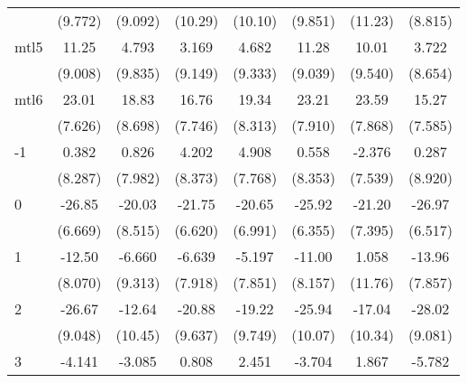 \documentclass{article}
\begin{document}
{\begin{longtable}{l*{7}{c}}
                &  (9.772)         &  (9.092)         &  (10.29)         &  (10.10)         &  (9.851)         &  (11.23)         &  (8.815)         \\
mtl5            &    11.25         &    4.793         &    3.169         &    4.682         &    11.28         &    10.01         &    3.722         \\
                &  (9.008)         &  (9.835)         &  (9.149)         &  (9.333)         &  (9.039)         &  (9.540)         &  (8.654)         \\
mtl6            &    23.01\sym{**} &    18.83\sym{*}  &    16.76\sym{*}  &    19.34\sym{*}  &    23.21\sym{**} &    23.59\sym{**} &    15.27         \\
                &  (7.626)         &  (8.698)         &  (7.746)         &  (8.313)         &  (7.910)         &  (7.868)         &  (7.585)         \\
-1              &    0.382         &    0.826         &    4.202         &    4.908         &    0.558         &   -2.376         &    0.287         \\
                &  (8.287)         &  (7.982)         &  (8.373)         &  (7.768)         &  (8.353)         &  (7.539)         &  (8.920)         \\
0               &   -26.85\sym{***}&   -20.03\sym{*}  &   -21.75\sym{**} &   -20.65\sym{**} &   -25.92\sym{***}&   -21.20\sym{**} &   -26.97\sym{***}\\
                &  (6.669)         &  (8.515)         &  (6.620)         &  (6.991)         &  (6.355)         &  (7.395)         &  (6.517)         \\
1               &   -12.50         &   -6.660         &   -6.639         &   -5.197         &   -11.00         &    1.058         &   -13.96         \\
                &  (8.070)         &  (9.313)         &  (7.918)         &  (7.851)         &  (8.157)         &  (11.76)         &  (7.857)         \\
2               &   -26.67\sym{**} &   -12.64         &   -20.88\sym{*}  &   -19.22         &   -25.94\sym{*}  &   -17.04         &   -28.02\sym{**} \\
                &  (9.048)         &  (10.45)         &  (9.637)         &  (9.749)         &  (10.07)         &  (10.34)         &  (9.081)         \\
3               &   -4.141         &   -3.085         &    0.808         &    2.451         &   -3.704         &    1.867         &   -5.782         \\

\end{longtable}}
\end{document}
